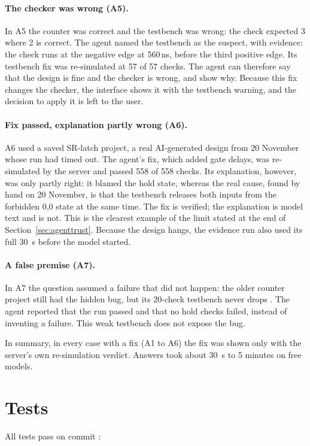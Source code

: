 \paragraph{The checker was wrong (A5).} In A5 the counter was correct and the
testbench was wrong: the check  expected 3 where 2 is
correct. The agent named the testbench as the suspect, with evidence: the check runs
at the negative edge at 560\,ns, before the third positive edge. Its testbench fix
was re-simulated at 57 of 57 checks. The agent can therefore say that the design is
fine and the checker is wrong, and show why. Because this fix changes the checker,
the interface shows it with the testbench warning, and the decision to apply it is
left to the user.

\paragraph{Fix passed, explanation partly wrong (A6).} A6 used a saved SR-latch
project, a real AI-generated design from 20 November whose run had timed out. The
agent's fix, which added gate delays, was re-simulated by the server and passed 558
of 558 checks. Its explanation, however, was only partly right: it blamed the hold
state, whereas the real cause, found by hand on 20 November, is that the testbench
releases both inputs from the forbidden 0,0 state at the same time. The fix is
verified; the explanation is model text and is not. This is the clearest example of
the limit stated at the end of Section~\ref{sec:agenttrust}. Because the design hangs,
the evidence run also used its full 30~s before the model started.

\paragraph{A false premise (A7).} In A7 the question assumed a failure that did not
happen: the older counter project still had the hidden bug, but its 20-check
testbench never drops . The agent reported that the run passed and
that no hold checks failed, instead of inventing a failure. This weak testbench
does not expose the bug.

In summary, in every case with a fix (A1 to A6) the fix was shown only with the
server's own re-simulation verdict. Answers took about 30~s to 5 minutes on free
models.

\section{Tests}
\label{sec:agenttests}
All tests pass on commit :

